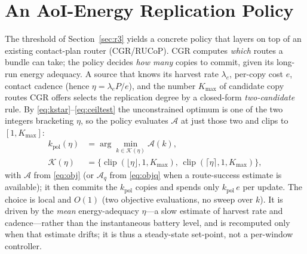 \documentclass[twocolumn,3p,times,procedia]{elsarticle}
\begin{document}
\section{An AoI-Energy Replication Policy}\label{sec:policy}
The threshold of Section~\ref{sec:r3} yields a concrete policy that layers
on top of an existing contact-plan router (CGR/RUCoP). CGR computes
\emph{which} routes a bundle can take; the policy decides \emph{how many}
copies to commit, given its long-run energy adequacy. A source that knows its
harvest rate $\lambda_e$, per-copy cost $e$, contact cadence (hence
$\eta=\lambda_e P/e$), and the number $K_{\max}$ of candidate copy
routes CGR offers selects the replication degree by a closed-form
\emph{two-candidate} rule. By \eqref{eq:kstar}--\eqref{eq:ceiltest} the
unconstrained optimum is one of the two integers bracketing $\eta$, so the
policy
evaluates $\mathcal{A}$ at just those two and clips to $[1,K_{\max}]$:
\begin{equation}\label{eq:policy}
\begin{aligned}
k_{\mathrm{pol}}(\eta)&=\arg\min_{k\in\mathcal{K}(\eta)}\mathcal{A}(k),\\
\mathcal{K}(\eta)&=\bigl\{\operatorname{clip}(\lfloor\eta\rfloor,1,K_{\max}),\,
  \operatorname{clip}(\lceil\eta\rceil,1,K_{\max})\bigr\},
\end{aligned}
\end{equation}
with $\mathcal{A}$ from \eqref{eq:obj} (or $\mathcal{A}_q$ from
\eqref{eq:objq} when a route-success estimate is available); it then
commits the $k_{\mathrm{pol}}$ copies and spends only
$k_{\mathrm{pol}}\,e$ per update. The choice is local and $O(1)$ (two
objective evaluations, no sweep over $k$). It is driven by the
\emph{mean} energy-adequacy $\eta$---a slow estimate of harvest rate and
cadence---rather than the instantaneous battery level, and is recomputed
only when that estimate drifts; it is thus a steady-state set-point, not a
per-window controller.
\end{document}
